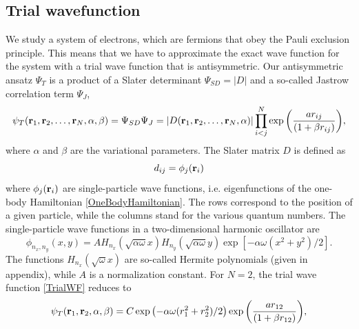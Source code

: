 \documentclass[english, a4paper]{article}
\begin{document}
\subsection{Trial wavefunction}
We study a system of electrons, which are fermions that obey the Pauli exclusion principle.
This means that we have to approximate the exact wave function for the system with a trial
wave function that is antisymmetric. Our antisymmetric ansatz $\Psi_T$ is a product of a 
Slater determinant $\Psi_{SD} = |D|$ and a so-called Jastrow correlation term $\Psi_J$,
\begin{equation}
   \psi_{T}({\bf r}_1,{\bf r}_2,\dots, {\bf r}_N, \alpha, \beta) = \Psi_{SD}\Psi_J = 
   |D({\bf r}_1,{\bf r}_2,\dots, {\bf r}_N, \alpha)|
   \prod_{i<j}^{N}\exp{\left(\frac{a r_{ij}}{(1+\beta r_{ij})}\right)}, 
   \label{TrialWF}
\end{equation}
where $\alpha$ and $\beta$ are the variational parameters.
The Slater matrix $D$ is defined as
\begin{equation}
 d_{ij} = \phi_j({\bf r}_i)
 \label{slaterMatrix}
\end{equation}
where $\phi_j({\bf r}_i)$ are single-particle wave functions, i.e. eigenfunctions of the one-body 
Hamiltonian \eqref{OneBodyHamiltonian}. The rows correspond to the position of a given particle, 
while the columns stand for the various quantum numbers.
The single-particle wave functions in a two-dimensional harmonic oscillator are
\begin{equation}
 \phi_{n_x,n_y}(x,y) = A H_{n_x}(\sqrt{\alpha\omega}x)H_{n_y}(\sqrt{\alpha\omega}y)\exp{[-\alpha\omega(x^2+y^2)/2]}.
\end{equation}
The functions $H_{n_x}(\sqrt{\omega}x)$ are so-called Hermite polynomials (given in appendix), while
$A$ is a normalization constant. 
For $N=2$, the trial wave function \eqref{TrialWF} reduces to
\begin{equation}
   \psi_{T}({\bf r}_1,{\bf r}_2, \alpha, \beta) = 
   C\exp{\left(-\alpha\omega(r_1^2+r_2^2)/2\right)}
   \exp{\left(\frac{ar_{12}}{(1+\beta r_{12})}\right)}, 
\label{trialWF2}
\end{equation}



 
\end{document}
